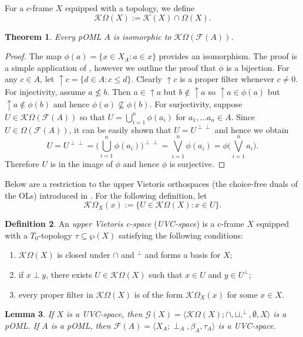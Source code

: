 \documentclass{amsart}
\theoremstyle{plain}
\newtheorem{theorem}{Theorem}[section]
\newtheorem{lemma}[theorem]{Lemma}
\theoremstyle{definition}
\newtheorem{definition}[theorem]{Definition}
\begin{document}
For a $c$-frame $X$ equipped with a topology, we define \[\mathcal{K}\Omega(X):=\mathcal{K}(X)\cap\Omega(X).\] 
\begin{theorem}\label{isomorphism}
    Every pOML $A$ is isomorphic to $\mathcal{K}\Omega(\mathcal{F}(A))$.  
\end{theorem}
\begin{proof}
    The map $\phi(a)=\{x\in X_A:a\in x\}$ provides an isomorphism. The proof is a simple application of \cite[Theorem 3.4.2]{mcdonald}, however we outline the proof that $\phi$ is a bijection. For any $c\in A$, let ${\uparrow}c=\{d\in A:c\leq d\}$. Clearly ${\uparrow}c$ is a proper filter whenever $c\not=0$. For injectivity, assume $a\not\leq b$. Then $a\in{\uparrow}a$ but $b\not\in{\uparrow}a$ so ${\uparrow}a\in\phi(a)$ but ${\uparrow}a\not\in\phi(b)$ and hence $\phi(a)\not\subseteq\phi(b)$. For surjectivity, suppose $U\in\mathcal{K}\Omega(\mathcal{F}(A))$ so that $U=\bigcup^n_{i=1}\phi(a_i)$ for $a_1,\dots a_n\in A$. Since $U\in\Omega(\mathcal{F}(A))$, it can be easily shown that $U=U^{\perp\perp}$ and hence we obtain \[U=U^{\perp\perp}=\biggl(\bigcup_{i=1}^n\phi(a_i)\biggl)^{\perp\perp}=\bigvee^n_{i=1}\phi(a_i)=\phi\biggl(\bigvee_{i=1}^na_i\biggl).\] Therefore $U$ is in the image of $\phi$ and hence $\phi$ is surjective. 
\end{proof}
 Below are a restriction to the upper Vietoris orthospaces (the choice-free duals of the OLs) introduced in \cite{mcdonald}. For the following definition, let \[\mathcal{K}\Omega_X(x):=\{U\in\mathcal{K}\Omega(X):x\in U\}.\]  
\begin{definition}\label{uvc-space}
    An \emph{upper Vietoris c-space} (\emph{UVC-space}) is a c-frame $X$ equipped with a $T_0$-topology $\tau\subseteq\wp(X)$ satisfying the following conditions: 
    \begin{enumerate}
        \item $\mathcal{K}\Omega(X)$ is closed under $\cap$ and $^{\perp}$ and forms a basis for $X$;
        \item if $x\perp y$, there exists $U\in\mathcal{K}\Omega(X)$ such that $x\in U$ and $y\in U^{\perp}$; 
        \item every proper filter in $\mathcal{K}\Omega(X)$ is of the form $\mathcal{K}\Omega_X(x)$ for some $x\in X$. 
    \end{enumerate}
\end{definition}
\begin{lemma}\label{functors}
    If $X$ is a UVC-space, then $\mathcal{G}(X)=\langle\mathcal{K}\Omega(X);\cap,\sqcup,^{\perp},\emptyset,X\rangle$ is a pOML. If $A$ is a pOML, then $\mathcal{F}(A)=\langle X_A;\perp_A,\beta_A,\tau_A\rangle$ is a UVC-space. 
\end{lemma}
\end{document}

